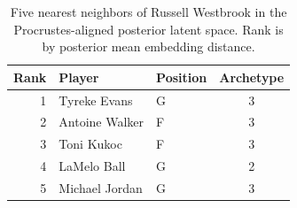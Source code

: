 \begin{table}[htbp]
  \centering\small
  \begin{tabular}{rllc}
    \toprule
    Rank & Player & Position & Archetype \\
    \midrule
    1 & Tyreke Evans & G & 3 \\
    2 & Antoine Walker & F & 3 \\
    3 & Toni Kukoc & F & 3 \\
    4 & LaMelo Ball & G & 2 \\
    5 & Michael Jordan & G & 3 \\
    \bottomrule
  \end{tabular}
  \caption{Five nearest neighbors of Russell Westbrook in the Procrustes-aligned posterior latent space. Rank is by posterior mean embedding distance.}
  \label{tab:Russell_Westbrook_neighbors}
\end{table}

